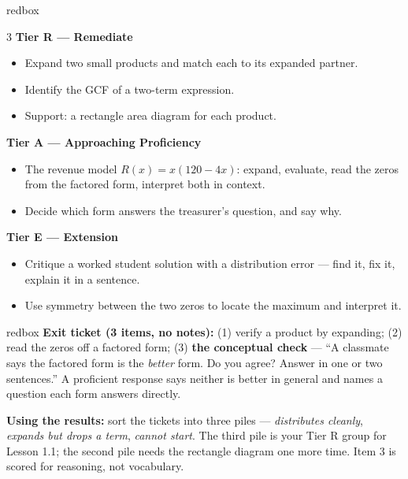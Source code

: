 \documentclass[10pt]{article}
\begin{document}
\boxguard
\begin{skillbox}{redbox}
\begin{multicols}{3}
\textbf{Tier R --- Remediate}
\begin{itemize}[leftmargin=1em, itemsep=1pt, topsep=2pt]
  \item Expand two small products and match each to its expanded partner.
  \item Identify the GCF of a two-term expression.
  \item Support: a rectangle area diagram for each product.
\end{itemize}

\columnbreak
\textbf{Tier A --- Approaching Proficiency}
\begin{itemize}[leftmargin=1em, itemsep=1pt, topsep=2pt]
  \item The revenue model $R(x)=x(120-4x)$: expand, evaluate, read the zeros from the factored
        form, interpret both in context.
  \item Decide which form answers the treasurer's question, and say why.
\end{itemize}

\columnbreak
\textbf{Tier E --- Extension}
\begin{itemize}[leftmargin=1em, itemsep=1pt, topsep=2pt]
  \item Critique a worked student solution with a distribution error --- find it, fix it,
        explain it in a sentence.
  \item Use symmetry between the two zeros to locate the maximum and interpret it.
\end{itemize}
\end{multicols}
\end{skillbox}

\begin{skillbox}{redbox}
\textbf{Exit ticket (3 items, no notes):} (1) verify a product by expanding; (2) read the zeros
off a factored form; (3) \textbf{the conceptual check} --- ``A classmate says the factored form
is the \emph{better} form. Do you agree? Answer in one or two sentences.'' A proficient response
says neither is better in general and names a question each form answers directly.

\textbf{Using the results:} sort the tickets into three piles --- \emph{distributes cleanly},
\emph{expands but drops a term}, \emph{cannot start}. The third pile is your Tier R group for
Lesson 1.1; the second pile needs the rectangle diagram one more time. Item 3 is scored for
reasoning, not vocabulary.
\end{skillbox}
\end{document}
